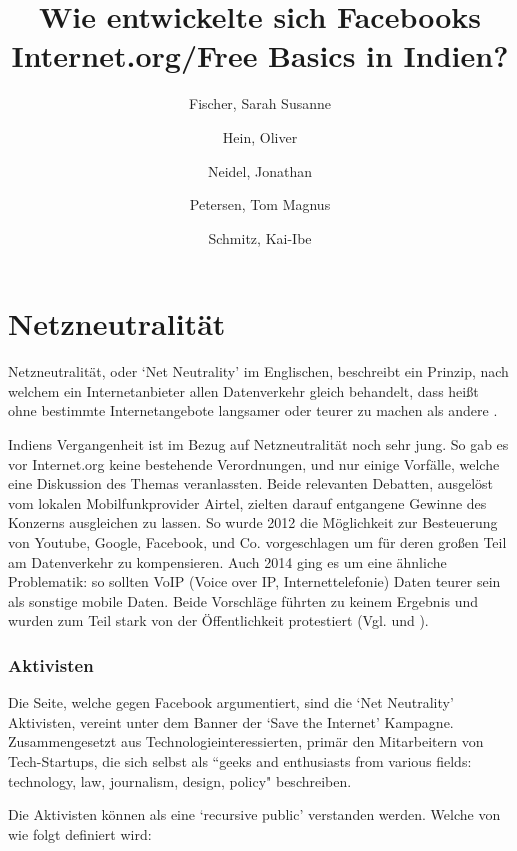 \documentclass{article}
\title{Wie entwickelte sich Facebooks Internet.org/Free Basics in Indien?}
\author{
  Fischer, Sarah Susanne\\
  \and
  Hein, Oliver\\
  \and
  Neidel, Jonathan\\
  \and
  Petersen, Tom Magnus\\
  \and
  Schmitz, Kai-Ibe\\
}
\begin{document}
\maketitle

\section{Netzneutralität}

Netzneutralität, oder `Net Neutrality' im Englischen, beschreibt ein Prinzip, nach welchem ein Internetanbieter allen Datenverkehr gleich behandelt, dass heißt ohne bestimmte Internetangebote langsamer oder teurer zu machen als andere \autocite{netzneutralität}.

\medskip

Indiens Vergangenheit ist im Bezug auf Netzneutralität noch sehr jung. So gab es vor Internet.org keine bestehende Verordnungen, und nur einige Vorfälle, welche eine Diskussion des Themas veranlassten.
Beide relevanten Debatten, ausgelöst vom lokalen Mobilfunkprovider Airtel, zielten darauf entgangene Gewinne des Konzerns ausgleichen zu lassen.
So wurde 2012 die Möglichkeit zur Besteuerung von Youtube, Google, Facebook, und Co. vorgeschlagen um für deren großen Teil am Datenverkehr zu kompensieren.
Auch 2014 ging es um eine ähnliche Problematik: so sollten VoIP (Voice over IP, Internettelefonie) Daten teurer sein als sonstige mobile Daten.
Beide Vorschläge führten zu keinem Ergebnis und wurden zum Teil stark von der Öffentlichkeit protestiert (Vgl. \textcite[253]{everydayLife} und \textcite{airtelVoip}).

\subsubsection{Aktivisten}

Die Seite, welche gegen Facebook argumentiert, sind die `Net Neutrality' Aktivisten, vereint unter dem Banner der `Save the Internet' Kampagne.
Zusammengesetzt aus Technologieinteressierten, primär den Mitarbeitern von Tech-Startups, die sich selbst als ``geeks and enthusiasts from various fields: technology, law, journalism, design, policy" \parencite{sti2015} beschreiben.

\medskip

Die Aktivisten können als eine `recursive public' verstanden werden. Welche von \textcite{twoBits} wie folgt definiert wird:

\medskip
\end{document}
